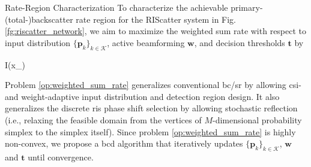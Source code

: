 \documentclass[journal]{IEEEtran}
\begin{document}
\begin{section}{Rate-Region Characterization}
	To characterize the achievable primary-(total-)backscatter rate region for the RIScatter system in Fig. \ref{fg:riscatter_network}, we aim to maximize the weighted sum rate with respect to input distribution $\{\boldsymbol{p}_k\}_{k \in \mathcal{K}}$, active beamforming $\boldsymbol{w}$, and decision thresholds $\boldsymbol{t}$ by
	\begin{maxi!}
		{}{I(x_{})}{\label{op:weighted_sum_rate}}{\label{ob:weighted_sum_rate}}
	\end{maxi!}

	Problem \eqref{op:weighted_sum_rate} generalizes conventional \gls{bc}/\gls{sr} by allowing \gls{csi}- and weight-adaptive input distribution and detection region design.
	It also generalizes the discrete \gls{ris} phase shift selection by allowing stochastic reflection (i.e., relaxing the feasible domain from the vertices of $M$-dimensional probability simplex to the simplex itself).
	Since problem \eqref{op:weighted_sum_rate} is highly non-convex, we propose a \gls{bcd} algorithm that iteratively updates $\{\boldsymbol{p}_k\}_{k \in \mathcal{K}}$, $\boldsymbol{w}$ and $\boldsymbol{t}$ until convergence.


\end{section}
\end{document}
